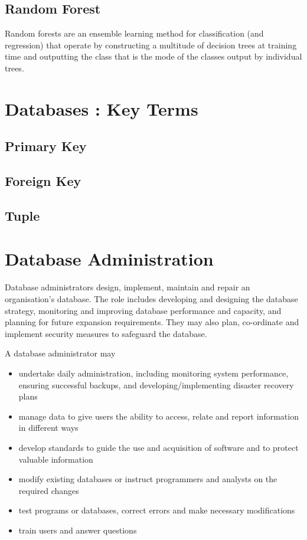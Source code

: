\documentclass[11pt]{article} %
\begin{document}
\subsection{Random Forest}
Random forests are an ensemble learning method for classification (and regression) that operate by constructing a multitude of decision trees at training time and outputting the class that is the mode of the classes output by individual trees.
\newpage


\newpage

\section{Databases : Key Terms}
\subsection{Primary Key}
\subsection{Foreign Key}
\subsection{Tuple}

\section{Database Administration}
Database administrators design, implement, maintain and repair an organisation's database. The role includes developing and designing the database strategy, monitoring and improving database performance and capacity, and planning for future expansion requirements. They may also plan, co-ordinate and implement security measures to safeguard the database.

A database administrator may
\begin{itemize}
\item undertake daily administration, including monitoring system performance, ensuring successful backups, and developing/implementing disaster recovery plans
\item manage data to give users the ability to access, relate and report information in different ways
\item develop standards to guide the use and acquisition of software and to protect valuable information
\item modify existing databases or instruct programmers and analysts on the required changes
\item test programs or databases, correct errors and make necessary modifications
\item train users and answer questions
\end{itemize}
\end{document}
